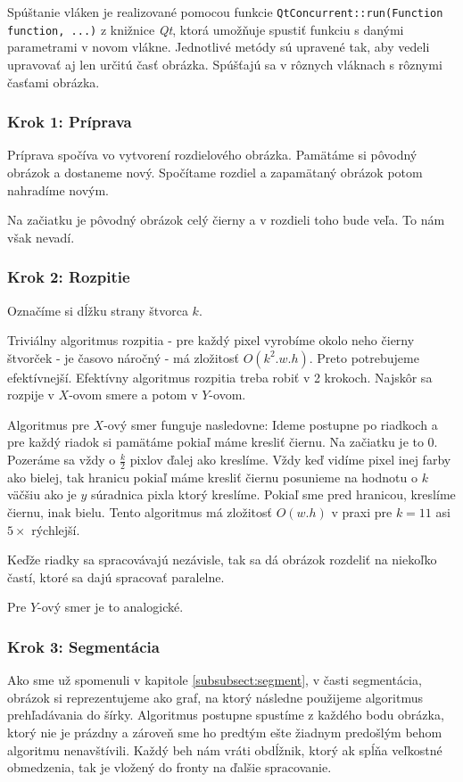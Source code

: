 Spúštanie vláken je realizované pomocou funkcie {\tt QtConcurrent::run(Function function, ...)} z knižnice \textit{Qt}, ktorá umožňuje spustiť funkciu s danými parametrami v novom vlákne. Jednotlivé metódy sú upravené tak, aby vedeli upravovať aj len určitú časť obrázka. Spúšťajú sa v rôznych vláknach s rôznymi časťami obrázka. %

\subsubsection{Krok 1: Príprava}
Príprava spočíva vo vytvorení rozdielového obrázka. Pamätáme si pôvodný obrázok a dostaneme nový. Spočítame rozdiel a zapamätaný obrázok potom nahradíme novým.

Na začiatku je pôvodný obrázok celý čierny a v rozdieli toho bude veľa. To nám však nevadí. 

\subsubsection{Krok 2: Rozpitie}
Označíme si dĺžku strany štvorca $k$.

Triviálny algoritmus rozpitia - pre každý pixel vyrobíme okolo neho čierny štvorček - je časovo náročný - má zložitosť $O(k^2.w.h)$. Preto potrebujeme efektívnejší. 
Efektívny algoritmus rozpitia treba robiť v 2 krokoch. Najskôr sa rozpije v $X$-ovom smere a potom v $Y$-ovom.

Algoritmus pre $X$-ový smer funguje nasledovne: Ideme postupne po riadkoch a pre každý riadok si pamätáme pokiaľ máme kresliť čiernu.
Na začiatku je to 0. Pozeráme sa vždy o $\frac{k}{2}$ pixlov ďalej ako kreslíme.
Vždy keď vidíme pixel inej farby ako bielej, tak hranicu pokiaľ máme kresliť čiernu posunieme na hodnotu o $k$ väčšiu ako je $y$ súradnica pixla ktorý kreslíme. Pokiaľ sme pred hranicou, kreslíme čiernu, inak bielu. Tento algoritmus má zložitosť $O(w.h)$ v praxi pre $k=11$ asi $5\times$ rýchlejší.  

Keďže riadky sa spracovávajú nezávisle, tak sa dá obrázok rozdeliť na niekoľko častí, ktoré sa dajú spracovať paralelne.

Pre $Y$-ový smer je to analogické. 

\subsubsection{Krok 3: Segmentácia}
Ako sme už spomenuli v kapitole \ref{subsubsect:segment}, v časti segmentácia, obrázok si reprezentujeme ako graf, na ktorý následne použijeme algoritmus prehľadávania do šírky. Algoritmus postupne spustíme z každého bodu obrázka, ktorý nie je prázdny a zároveň sme ho predtým ešte žiadnym predošlým behom algoritmu nenavštívili. Každý beh nám vráti obdĺžnik, ktorý ak spĺňa veľkostné obmedzenia, tak je vložený do fronty na ďalšie spracovanie. 

